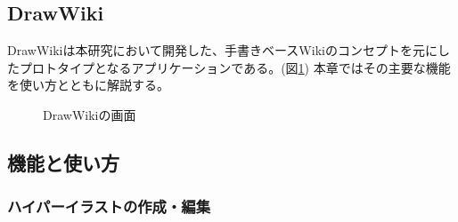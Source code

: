 \subsection{DrawWiki}
DrawWikiは本研究において開発した、手書きベースWikiのコンセプトを元にしたプロトタイプとなるアプリケーションである。(図\ref{drawwiki})
本章ではその主要な機能を使い方とともに解説する。

\begin{figure}[htbp]
    \begin{center}
         \end{center}
    \caption{DrawWikiの画面}
    \label{drawwiki}
\end{figure}

\subsection{機能と使い方}

\subsubsection{ハイパーイラストの作成・編集}


